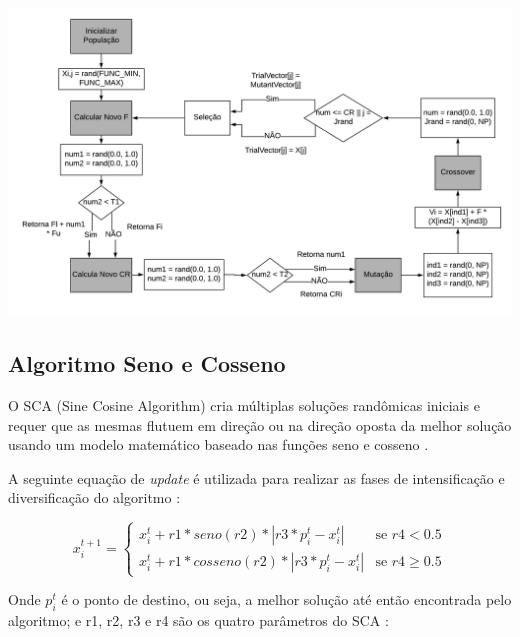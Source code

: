 {
    \centering
    \includegraphics[width=0.9\linewidth]{figuras/Diagrama_de_Blocos.png}
    \label{fig:jDE}
}

\subsection{Algoritmo Seno e Cosseno}

O SCA (Sine Cosine Algorithm) cria múltiplas soluções randômicas iniciais e requer que as mesmas flutuem em direção ou na direção oposta da melhor solução usando um modelo matemático baseado nas funções seno e cosseno \cite{mirjalili}.

A seguinte equação de \textit{update} é utilizada para realizar as fases de intensificação e diversificação do algoritmo \cite{mirjalili}:

\begin{equation}
x_i^{t+1} = 
\begin{cases}
	x_i^t + r1 * seno(r2) * |r3 * p_i^t - x_i^t|    & \text{se $r4 < 0.5$}\\
    x_i^t + r1 * cosseno(r2) * |r3 * p_i^t - x_i^t| & \text{se $r4 \geq 0.5$}
\end{cases}
\end{equation}

Onde $p_i^t$ é o ponto de destino, ou seja, a melhor solução até então encontrada pelo algoritmo; e r1, r2, r3 e r4 são os quatro parâmetros do SCA \cite{mirjalili}:

